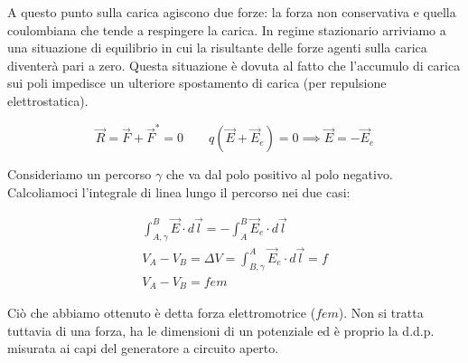 \begin{figure}[htpb]
\end{figure}
\FloatBarrier

A questo punto sulla carica agiscono due forze: la forza non conservativa e quella coulombiana che tende a respingere la carica. In regime stazionario arriviamo a una situazione di equilibrio in cui la risultante delle forze agenti sulla carica diventerà pari a zero. Questa situazione è dovuta al fatto che l'accumulo di carica sui poli impedisce un ulteriore spostamento di carica (per repulsione elettrostatica).

\[
	\vec{R} = \vec{F} + \vec{F}^* = 0 \qquad q(\vec{E} +\vec{E}_e ) = 0\implies \vec{E} = - \vec{E}_e
\]

Consideriamo un percorso $\gamma$ che va dal polo positivo al polo negativo. Calcoliamoci l'integrale di linea lungo il percorso nei due casi:

\begin{gather*}
	\int_{A,\gamma}^B \vec{E} \cdot d\vec{l} = - \int_A^B \vec{E}_e \cdot d\vec{l} \\
	V_A-V_B = \Delta V = \int_{B,\gamma}^A \vec{E}_e\cdot d\vec{l} = f \\
	\boxed{V_A-V_B=fem}
\end{gather*}

Ciò che abbiamo ottenuto è detta forza elettromotrice ($fem$). Non si tratta tuttavia di una forza, ha le dimensioni di un potenziale ed è proprio la d.d.p. misurata ai capi del generatore a circuito aperto.

